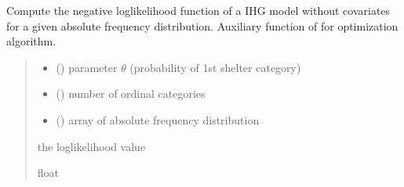 \documentclass[letterpaper,10pt,english]{sphinxmanual}
\begin{document}
\begin{fulllineitems}
\label{\detokenize{cubmods:cubmods.ihg.effe}}
\pysigstartsignatures
{}
\pysigstopsignatures
\sphinxAtStartPar
Compute the negative log\sphinxhyphen{}likelihood function of a IHG model without 
covariates for a given absolute frequency distribution.
Auxiliary function of  for optimization algorithm.
\begin{quote}\begin{description}
\begin{itemize}
\item {} 
\sphinxAtStartPar
{} () \textendash{} parameter \(\theta\) (probability of 1st shelter category)

\item {} 
\sphinxAtStartPar
{} () \textendash{} number of ordinal categories

\item {} 
\sphinxAtStartPar
{} () \textendash{} array of absolute frequency distribution

\end{itemize}

\sphinxAtStartPar
the log\sphinxhyphen{}likelihood value

\sphinxAtStartPar
float

\end{description}\end{quote}

\end{fulllineitems}

\end{document}
